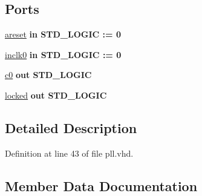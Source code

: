 \subsection*{Ports}
 \begin{DoxyCompactItemize}
\item 
\hyperlink{classpll_a5ff6e3af321d94570fc485fa1bce5a06}{areset}  {\bfseries {\bfseries \textcolor{keywordflow}{in}\textcolor{vhdlchar}{ }}} {\bfseries \textcolor{comment}{S\+T\+D\+\_\+\+L\+O\+G\+I\+C}\textcolor{vhdlchar}{ }\textcolor{vhdlchar}{ }\textcolor{vhdlchar}{\+:}\textcolor{vhdlchar}{=}\textcolor{vhdlchar}{ }\textcolor{vhdlchar}{ }\textcolor{vhdlchar}{\textquotesingle{}}\textcolor{vhdlchar}{ } \textcolor{vhdldigit}{0} \textcolor{vhdlchar}{ }\textcolor{vhdlchar}{\textquotesingle{}}\textcolor{vhdlchar}{ }} 
\item 
\hyperlink{classpll_a9463f4cc62782c2faac516c942dcb5db}{inclk0}  {\bfseries {\bfseries \textcolor{keywordflow}{in}\textcolor{vhdlchar}{ }}} {\bfseries \textcolor{comment}{S\+T\+D\+\_\+\+L\+O\+G\+I\+C}\textcolor{vhdlchar}{ }\textcolor{vhdlchar}{ }\textcolor{vhdlchar}{\+:}\textcolor{vhdlchar}{=}\textcolor{vhdlchar}{ }\textcolor{vhdlchar}{ }\textcolor{vhdlchar}{\textquotesingle{}}\textcolor{vhdlchar}{ } \textcolor{vhdldigit}{0} \textcolor{vhdlchar}{ }\textcolor{vhdlchar}{\textquotesingle{}}\textcolor{vhdlchar}{ }} 
\item 
\hyperlink{classpll_abbf54d96b104435e8cbaadcf0e9184bd}{c0}  {\bfseries {\bfseries \textcolor{keywordflow}{out}\textcolor{vhdlchar}{ }}} {\bfseries \textcolor{comment}{S\+T\+D\+\_\+\+L\+O\+G\+I\+C}\textcolor{vhdlchar}{ }} 
\item 
\hyperlink{classpll_ab33e72e8245db404191648e9a25344eb}{locked}  {\bfseries {\bfseries \textcolor{keywordflow}{out}\textcolor{vhdlchar}{ }}} {\bfseries \textcolor{comment}{S\+T\+D\+\_\+\+L\+O\+G\+I\+C}\textcolor{vhdlchar}{ }} 
\end{DoxyCompactItemize}


\subsection{Detailed Description}


Definition at line 43 of file pll.\+vhd.



\subsection{Member Data Documentation}
\hypertarget{classpll_a470a86ce8776f637b0483eabf2d92ad2}{}
